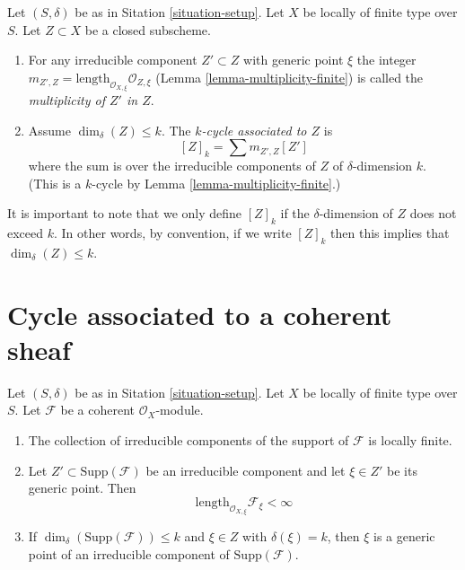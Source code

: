 \begin{definition}
\label{definition-cycle-associated-to-closed-subscheme}
Let $(S, \delta)$ be as in Sitation \ref{situation-setup}.
Let $X$ be locally of finite type over $S$.
Let $Z \subset X$ be a closed subscheme.
\begin{enumerate}
\item For any irreducible component $Z' \subset Z$ with generic point $\xi$
the integer
$m_{Z', Z} = \text{length}_{\mathcal{O}_{X, \xi}} \mathcal{O}_{Z, \xi}$
(Lemma \ref{lemma-multiplicity-finite})
is called the {\it multiplicity of $Z'$ in $Z$}.
\item Assume $\dim_\delta(Z) \leq k$.
The {\it $k$-cycle associated to $Z$} is
$$
[Z]_k
=
\sum m_{Z', Z}[Z']
$$
where the sum is over the irreducible components of $Z$
of $\delta$-dimension $k$. (This is a $k$-cycle by
Lemma \ref{lemma-multiplicity-finite}.)
\end{enumerate}
\end{definition}

\noindent
It is important to note that we only define $[Z]_k$ if the $\delta$-dimension
of $Z$ does not exceed $k$. In other words, by convention, if we write
$[Z]_k$ then this implies that $\dim_\delta(Z) \leq k$.



\section{Cycle associated to a coherent sheaf}
\label{section-cycle-of-coherent-sheaf}



\begin{lemma}
\label{lemma-length-finite}
Let $(S, \delta)$ be as in Sitation \ref{situation-setup}.
Let $X$ be locally of finite type over $S$.
Let $\mathcal{F}$ be a coherent $\mathcal{O}_X$-module.
\begin{enumerate}
\item The collection of irreducible components of the support of
$\mathcal{F}$ is locally finite.
\item Let $Z' \subset \text{Supp}(\mathcal{F})$
be an irreducible component and
let $\xi \in Z'$ be its generic point.
Then
$$
\text{length}_{\mathcal{O}_{X, \xi}} \mathcal{F}_\xi < \infty
$$
\item If $\dim_\delta(\text{Supp}(\mathcal{F})) \leq k$
and $\xi \in Z$ with $\delta(\xi) = k$, then $\xi$ is a
generic point of an irreducible component of $\text{Supp}(\mathcal{F})$.
\end{enumerate}
\end{lemma}

